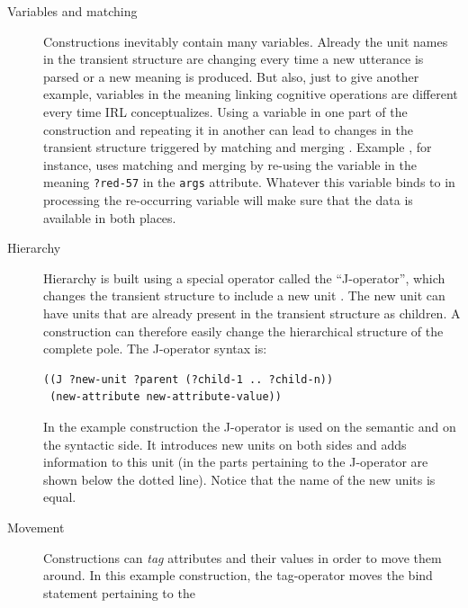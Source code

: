 \begin{description}
\item[Variables and matching] Constructions inevitably contain
many variables. Already the unit names in the transient structure
are changing every time a new utterance is parsed or a new meaning
is produced. But also, just to give another example, variables in the meaning 
linking cognitive operations are different every time IRL conceptualizes. 
Using a variable in one part of the construction and repeating it in another 
can lead to changes in the transient structure triggered
by matching and merging \citep{steels2006fcg}.
Example , for instance, uses matching and merging
by re-using the variable in the meaning {\footnotesize\tt ?red-57}
in the {\footnotesize\tt args} attribute. Whatever this variable binds
to in processing the re-occurring variable will make sure
that the data is available in both places.
\item[Hierarchy] Hierarchy is built using a special
operator called the ``J-operator'', which changes the
transient structure to include a new unit \citep{beule2005hierarchy}.
The new unit can have units that are already present in the 
transient structure as children. A construction can therefore 
easily change the hierarchical structure of the complete pole.
The J-operator syntax is:
\ea\label{e:j-op-syntax}
\begin{lstlisting}
((J ?new-unit ?parent (?child-1 .. ?child-n))
 (new-attribute new-attribute-value))
\end{lstlisting}\z
In the example construction the J-operator is used on the semantic
and on the syntactic side. It introduces new units on both sides 
and adds information to this unit (in 
the parts pertaining to the J-operator are shown below the dotted
line). Notice that the name of the new units is equal.
\item[Movement] Constructions can \emph{tag} attributes and
their values in order to move them around. In this example
construction, the tag-operator moves the bind statement pertaining to the

\end{description}

